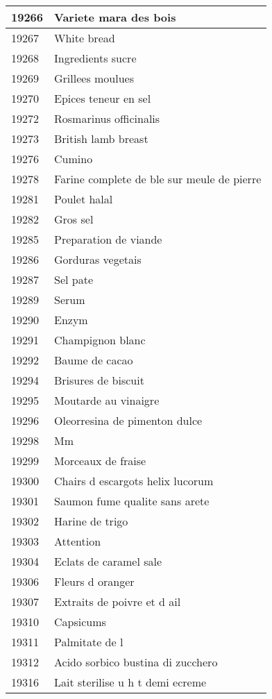 \begin{longtable}{|l|l|}
19266 & Variete mara des bois \\ \hline 
19267 & White bread \\ \hline 
19268 & Ingredients sucre \\ \hline 
19269 & Grillees moulues \\ \hline 
19270 & Epices teneur en sel \\ \hline 
19272 & Rosmarinus officinalis \\ \hline 
19273 & British lamb breast \\ \hline 
19276 & Cumino \\ \hline 
19278 & Farine complete de ble sur meule de pierre \\ \hline 
19281 & Poulet halal \\ \hline 
19282 & Gros sel \\ \hline 
19285 & Preparation de viande \\ \hline 
19286 & Gorduras vegetais \\ \hline 
19287 & Sel pate \\ \hline 
19289 & Serum \\ \hline 
19290 & Enzym \\ \hline 
19291 & Champignon blanc \\ \hline 
19292 & Baume de cacao \\ \hline 
19294 & Brisures de biscuit \\ \hline 
19295 & Moutarde au vinaigre \\ \hline 
19296 & Oleorresina de pimenton dulce \\ \hline 
19298 & Mm \\ \hline 
19299 & Morceaux de fraise \\ \hline 
19300 & Chairs d escargots helix lucorum \\ \hline 
19301 & Saumon fume qualite sans arete \\ \hline 
19302 & Harine de trigo \\ \hline 
19303 & Attention \\ \hline 
19304 & Eclats de caramel sale \\ \hline 
19306 & Fleurs d oranger \\ \hline 
19307 & Extraits de poivre et d ail \\ \hline 
19310 & Capsicums \\ \hline 
19311 & Palmitate de l \\ \hline 
19312 & Acido sorbico bustina di zucchero \\ \hline 
19316 & Lait sterilise u h t demi ecreme \\ \hline 

\end{longtable}
